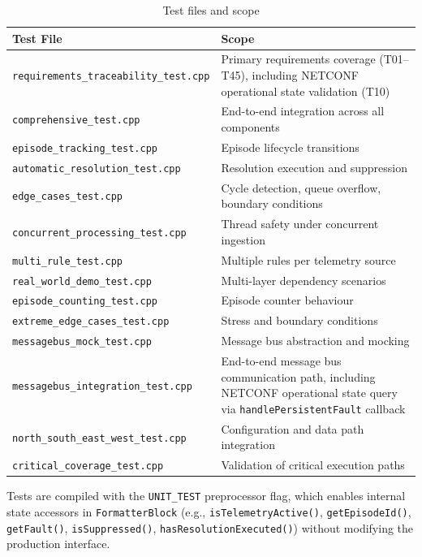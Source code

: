 \begin{table}[htbp]
\centering
\begin{tabular}{p{5cm} p{8cm}}
\hline
Test File & Scope \\
\hline
\texttt{requirements\_traceability\_test.cpp} & Primary requirements coverage (T01--T45), including NETCONF operational state validation (T10) \\
\texttt{comprehensive\_test.cpp} & End-to-end integration across all components \\
\texttt{episode\_tracking\_test.cpp} & Episode lifecycle transitions \\
\texttt{automatic\_resolution\_test.cpp} & Resolution execution and suppression \\
\texttt{edge\_cases\_test.cpp} & Cycle detection, queue overflow, boundary conditions \\
\texttt{concurrent\_processing\_test.cpp} & Thread safety under concurrent ingestion \\
\texttt{multi\_rule\_test.cpp} & Multiple rules per telemetry source \\
\texttt{real\_world\_demo\_test.cpp} & Multi-layer dependency scenarios \\
\texttt{episode\_counting\_test.cpp} & Episode counter behaviour \\
\texttt{extreme\_edge\_cases\_test.cpp} & Stress and boundary conditions \\
\texttt{messagebus\_mock\_test.cpp} & Message bus abstraction and mocking \\
\texttt{messagebus\_integration\_test.cpp} & End-to-end message bus communication path, including NETCONF operational state query via \texttt{handlePersistentFault} callback \\
\texttt{north\_south\_east\_west\_test.cpp} & Configuration and data path integration \\
\texttt{critical\_coverage\_test.cpp} & Validation of critical execution paths \\
\hline
\end{tabular}
\caption{Test files and scope}
\label{tab:test-files-scope}
\end{table}


Tests are compiled with the \texttt{UNIT\_TEST} preprocessor flag, which enables internal state accessors in \texttt{FormatterBlock} (e.g., \texttt{isTelemetryActive()}, \texttt{getEpisodeId()}, \texttt{getFault()}, \texttt{isSuppressed()}, \texttt{hasResolutionExecuted()}) without modifying the production interface.

